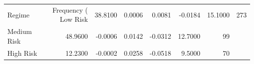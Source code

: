 \begin{tabular}{lrrrrrr}
\toprule
Regime & Frequency (%
\midrule
Low Risk & 38.8100 & 0.0006 & 0.0081 & -0.0184 & 15.1000 & 273 \\
Medium Risk & 48.9600 & -0.0006 & 0.0142 & -0.0312 & 12.7000 & 99 \\
High Risk & 12.2300 & -0.0002 & 0.0258 & -0.0518 & 9.5000 & 70 \\
\bottomrule
\end{tabular}
